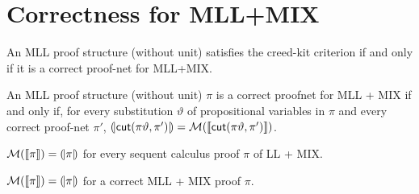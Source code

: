 \section{Correctness for \textsf{MLL+MIX}}


\begin{theorem}
    An \textsf{MLL} proof structure (without unit) satisfies the creed-kit criterion if and only if it is a correct proof-net for \textsf{MLL+MIX}.
\end{theorem}


\begin{theorem}
    An MLL proof structure (without unit) \( \pi \) is a correct proofnet for MLL + MIX if and only if, for every substitution \( \vartheta \) of propositional variables in \( \pi \) and every correct proof-net \( \pi' \), \( (\!|{\mathsf{cut}(\pi\vartheta, \pi')}|\!) = \mathcal{M}({\llbracket{\mathsf{cut}(\pi\vartheta, \pi')}\rrbracket}) \). 
\end{theorem}


\begin{corollary}
    \( \mathcal{M}({\llbracket{\pi}\rrbracket}) = (\!|{\pi}|\!) \) for every sequent calculus proof \( \pi \) of LL + MIX.
\end{corollary}
\begin{corollary}
    \( \mathcal{M}({\llbracket{\pi}\rrbracket}) = (\!|{\pi}|\!) \) for a correct MLL + MIX proof \( \pi \). 
\end{corollary}

